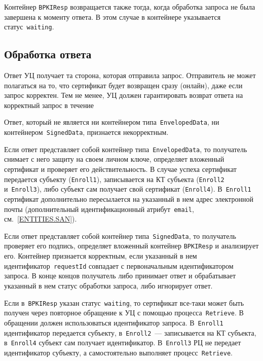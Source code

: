 
Контейнер \texttt{BPKIResp} возвращается также тогда,
когда обработка запроса не была завершена к моменту ответа.
В этом случае в контейнере указывается статус~\texttt{waiting}.

\subsection{Обработка ответа}\label{PROCESSES.Enroll.Finish}

Ответ УЦ получает та сторона, которая отправила запрос.
Отправитель не может полагаться на то, что сертификат
будет возвращен сразу (онлайн), даже если запрос корректен.
%
Тем не менее, УЦ должен гарантировать возврат ответа на корректный запрос  
в течение  

Ответ, который не является ни контейнером типа~\texttt{EnvelopedData},
ни контейнером~\texttt{SignedData}, признается некорректным.

Если ответ представляет собой контейнер типа~\texttt{EnvelopedData}, 
то получатель снимает с него защиту на своем личном ключе, определяет 
вложенный сертификат и проверяет его действительность. 
%
В случае успеха сертификат передается субъекту (\texttt{Enroll1}),
записывается на КТ субъекта (\texttt{Enroll2} и~\texttt{Enroll3}),
либо субъект сам получает свой сертификат (\texttt{Enroll4}).
%
В~\texttt{Enroll1} сертификат дополнительно пересылается на указанный в 
нем адрес электронной почты (дополнительный идентификационный 
атрибут~\texttt{email}, см.~\ref{ENTITIES.SAN}). 

Если ответ представляет собой контейнер типа~\texttt{SignedData}, 
то получатель проверяет его подпись, определяет вложенный контейнер 
\texttt{BPKIResp} и анализирует его. Контейнер признается
корректным, если указанный в нем идентификатор~\texttt{requestId}
совпадает с первоначальным идентификатором запроса.
%
В конце концов получатель либо принимает ответ и обрабатывает указанный 
в нем статус обработки запроса, либо игнорирует ответ.

Если в~\texttt{BPKIResp} указан статус~\texttt{waiting}, то сертификат 
все-таки может быть получен через повторное обращение к УЦ с помощью 
процесса~\texttt{Retrieve}. В обращении должен использоваться 
идентификатор запроса. 
%
В~\texttt{Enroll1} идентификатор передается субъекту,
в~\texttt{Enroll2}~--- записывается на КТ субъекта,
в~\texttt{Enroll4} субъект сам получает идентификатор.
%
В~\texttt{Enroll3} РЦ не передает идентификатор субъекту, 
а самостоятельно выполняет процесс~\texttt{Retrieve}.

